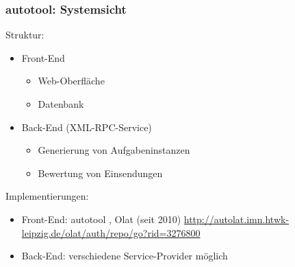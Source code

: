 \begin{frame}\frametitle{autotool: Systemsicht}

Struktur:
  \begin{itemize}
  \item Front-End
    \begin{itemize}
    \item Web-Oberfläche
    \item Datenbank
    \end{itemize}
  \item Back-End (XML-RPC-Service) 
    \begin{itemize}
    \item Generierung von Aufgabeninstanzen
    \item Bewertung von Einsendungen
    \end{itemize}
  \end{itemize}
Implementierungen:
\begin{itemize}
\item Front-End: autotool , Olat (seit 2010)
  \url{http://autolat.imn.htwk-leipzig.de/olat/auth/repo/go?rid=3276800}
\item Back-End: verschiedene Service-Provider möglich
\end{itemize}

\end{frame}
